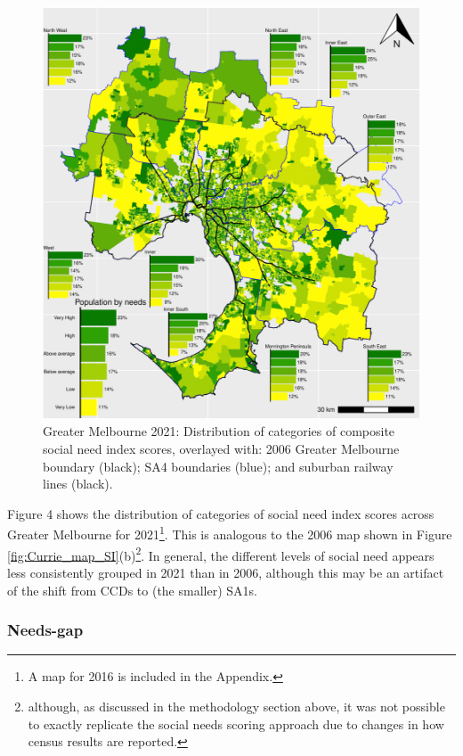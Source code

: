 \documentclass[preprint, 3p,
authoryear]{elsarticle} %
\begin{document}
\begin{figure}
\centering
\includegraphics{ReynoldsCurrieQu2024_files/figure-latex/Greater_Melbourne_2021_social_needs-1.pdf}
\caption{Greater Melbourne 2021: Distribution of categories of composite
social need index scores, overlayed with: 2006 Greater Melbourne
boundary (black); SA4 boundaries (blue); and suburban railway lines
(black).}
\end{figure}

Figure 4 shows the distribution of categories of social need index
scores across Greater Melbourne for 2021\footnote{A map for 2016 is
  included in the Appendix.}. This is analogous to the 2006 map shown in
Figure \ref{fig:Currie_map_SI}(b)\footnote{although, as discussed in the
  methodology section above, it was not possible to exactly replicate
  the \citet{currie2010identifying} social needs scoring approach due to
  changes in how census results are reported.}. In general, the
different levels of social need appears less consistently grouped in
2021 than in 2006, although this may be an artifact of the shift from
CCDs to (the smaller) SA1s.

\subsubsection{Needs-gap}\label{needs-gap}
\end{document}
